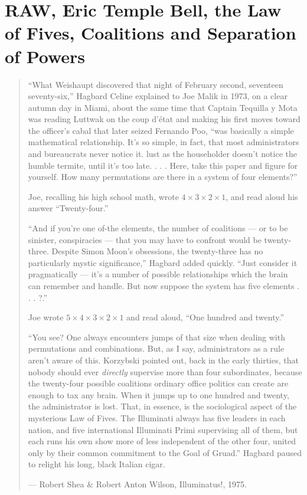 \chapter[Coalitions and Separation of Powers]{RAW, Eric Temple Bell, the Law of Fives, Coalitions and Separation of Powers}

\blockquote{
\small{``What Weishaupt discovered that night of February second, seventeen seventy-six,'' Hagbard Celine explained to Joe Malik in 1973, on a clear autumn day in Miami, about the same time that Captain Tequilla y Mota was reading Luttwak on the coup d'\'etat and making his first moves toward the officer's cabal that later seized Fernando Poo, ``was basically a simple mathematical relationship. It's so simple, in fact, that most administrators and bureaucrats never notice it. lust as the householder doesn't notice the humble termite, until it's too late. . . . Here, take this paper and figure for yourself. How many permutations are there in a system of four elements?''

Joe, recalling his high school math, wrote $4\times3\times2\times1$, and read aloud his answer ``Twenty-four.''

``And if you're one of-the elements, the number of coalitions --- or to be sinister, conspiracies --- that you may have to confront would be twenty-three. Despite Simon Moon's obsessions, the twenty-three has no particularly mystic significance,'' Hagbard added quickly. ``Just consider it pragmatically --- it's a number of possible relationships which the brain can remember 	and handle. But now suppose the system has five elements . . . ?.''

Joe wrote $5\times4\times3\times2\times1$ and read aloud, ``One hundred and twenty.''

``You see? One always encounters jumps of that size when dealing with permutations and combinations. But, as I say, administrators as a rule aren't aware of this. Korzybski pointed out, back in the early thirties, that nobody should ever \textit{directly} supervise more than four subordinates, because the twenty-four possible coalitions ordinary office politics can create are enough to tax any brain. When it jumps up to one hundred and twenty, the administrator is lost. That, in essence, is the sociological aspect of the mysterious Law of Fives. The Illuminati always has five leaders in each nation, and five international Illuminati Primi supervising all of them, but each runs his own show more of less independent of the other four, united only by their common commitment to the Goal of Gruad.'' Hagbard paused to relight his long, black Italian cigar.}
\par\begin{flushright} \textup{--- Robert Shea \& Robert Anton Wilson}, Illuminatus!, 1975. \end{flushright}
}

